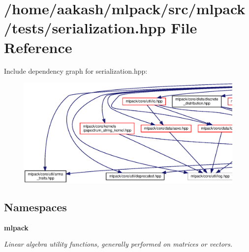 \section{/home/aakash/mlpack/src/mlpack/tests/serialization.hpp File Reference}
\label{serialization_8hpp}
Include dependency graph for serialization.\+hpp\+:
\nopagebreak
\begin{figure}[H]
\begin{center}
\leavevmode
\includegraphics[width=350pt]{serialization_8hpp__incl}
\end{center}
\end{figure}
\subsection*{Namespaces}
\begin{DoxyCompactItemize}
\item 
 \textbf{ mlpack}
\begin{DoxyCompactList}\small\item\em Linear algebra utility functions, generally performed on matrices or vectors. \end{DoxyCompactList}\end{DoxyCompactItemize}
